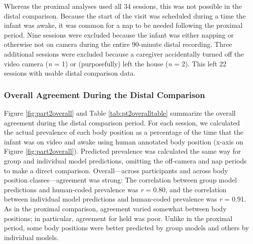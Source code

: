 \documentclass[
  man]{apa6}
\begin{document}
Whereas the proximal analyses used all 34 sessions, this was not possible in the distal comparison. Because the start of the visit was scheduled during a time the infant was awake, it was common for a nap to be needed following the proximal period. Nine sessions were excluded because the infant was either napping or otherwise not on camera during the entire 90-minute distal recording. Three additional sessions were excluded because a caregiver accidentally turned off the video camera (\emph{n} = 1) or (purposefully) left the house (\emph{n} = 2). This left 22 sessions with usable distal comparison data.

\hypertarget{overall-agreement-during-the-distal-comparison}{%
\subsubsection{Overall Agreement During the Distal Comparison}\label{overall-agreement-during-the-distal-comparison}}

Figure \ref{fig:part2overall} and Table \ref{tab:pt2overalltable} summarize the overall agreement during the distal comparison period. For each session, we calculated the actual prevalence of each body position as a percentage of the time that the infant was on video and awake using human annotated body position (x-axis on Figure \ref{fig:part2overall}). Predicted prevalence was calculated the same way for group and individual model predictions, omitting the off-camera and nap periods to make a direct comparison. Overall---across participants and across body position classes---agreement was strong: The correlation between group model predictions and human-coded prevalence was \emph{r} = 0.80, and the correlation between individual model predictions and human-coded prevalence was \emph{r} = 0.91. As in the proximal comparison, agreement varied somewhat between body positions; in particular, agreement for held was poor. Unlike in the proximal period, some body positions were better predicted by group models and others by individual models.
\end{document}
